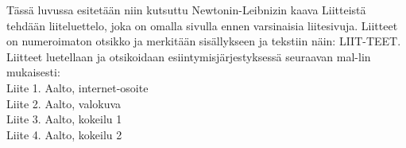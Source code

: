 Tässä luvussa esitetään niin kutsuttu Newtonin-Leibnizin kaava Liitteistä tehdään liiteluettelo, joka on omalla sivulla ennen varsinaisia liitesivuja. Liitteet on numeroimaton otsikko ja merkitään sisällykseen ja tekstiin näin: LIIT-TEET. Liitteet luetellaan ja otsikoidaan esiintymisjärjestyksessä seuraavan mal-lin mukaisesti: \\

Liite 1. 	Aalto, internet-osoite\\
Liite 2. 	Aalto, valokuva\\
Liite 3. 	Aalto, kokeilu 1\\
Liite 4. 	Aalto, kokeilu 2\\



